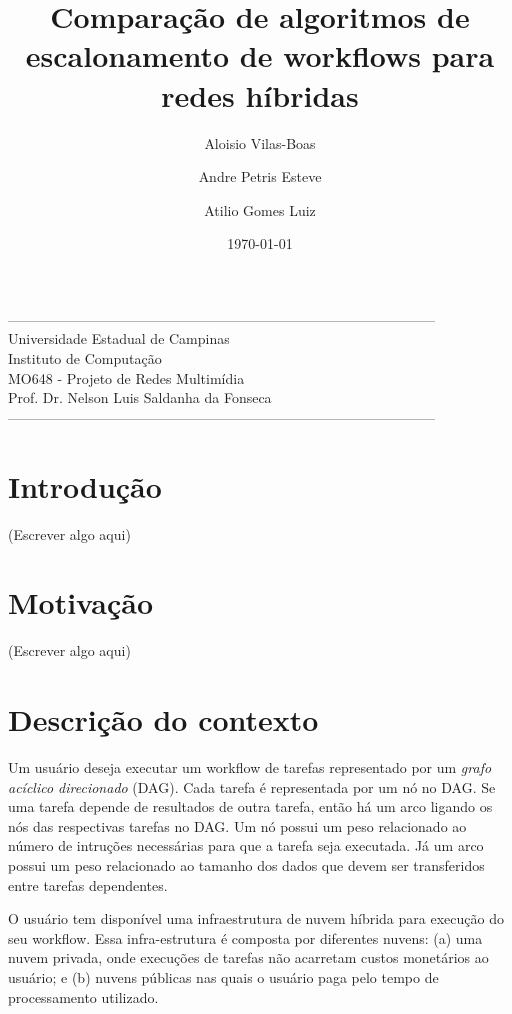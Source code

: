 \documentclass[a4paper,10pt]{article}
\title{Comparação de algoritmos de escalonamento de workflows para redes híbridas}
\author{Aloisio Vilas-Boas\and Andre Petris Esteve\and Atilio Gomes Luiz}
\date{\today}
\begin{document}
\maketitle

\begin{center}
--------------------------------------------------------------------------------------------\\
Universidade Estadual de Campinas\\
Instituto de Computação\\
MO648 - Projeto de Redes Multimídia\\
Prof. Dr. Nelson Luis Saldanha da Fonseca\\
--------------------------------------------------------------------------------------------\\
\end{center}

\section{Introdução}

(Escrever algo aqui)

\section{Motivação}

(Escrever algo aqui)

\section{Descrição do contexto}

Um usuário deseja executar um workflow de tarefas representado por um \emph{grafo acíclico 
direcionado} (DAG). Cada tarefa é representada por um nó no DAG. Se uma tarefa depende de
resultados de outra tarefa, então há um arco ligando os nós das respectivas tarefas no DAG.
Um nó possui um peso relacionado ao número de intruções necessárias para que a tarefa seja executada.
Já um arco possui um peso relacionado ao tamanho dos dados que devem ser transferidos entre tarefas
dependentes.

O usuário tem disponível uma infraestrutura de nuvem híbrida para execução do 
seu workflow. Essa infra-estrutura é composta por diferentes nuvens: (a) uma nuvem 
privada, onde execuções de tarefas não acarretam custos monetários ao usuário; e (b) 
nuvens públicas nas quais o usuário paga pelo tempo de processamento utilizado.
\end{document}
